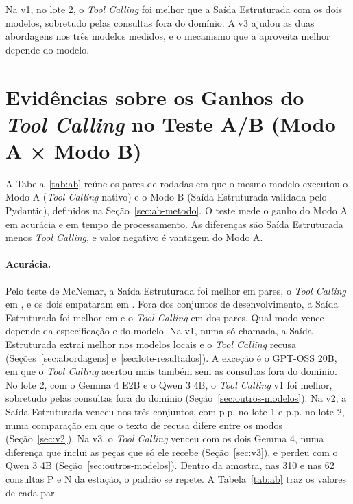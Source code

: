 Na v1, no lote 2, o \textit{Tool Calling} foi melhor que a Saída Estruturada com os dois modelos, sobretudo pelas consultas fora do domínio. A v3 ajudou as duas abordagens nos três modelos medidos, e o mecanismo que a aproveita melhor depende do modelo.

\section{Evidências sobre os Ganhos do \texorpdfstring{\textit{Tool Calling}}{Tool Calling} no Teste A/B (Modo A × Modo B)}
\label{sec:ab}

A Tabela~\ref{tab:ab} reúne os  pares de rodadas em que o mesmo modelo executou o Modo A (\textit{Tool Calling} nativo) e o Modo B (Saída Estruturada validada pelo Pydantic), definidos na Seção~\ref{sec:ab-metodo}. O teste mede o ganho do Modo A em acurácia e em tempo de processamento. As diferenças são Saída Estruturada menos \textit{Tool Calling}, e valor negativo é vantagem do Modo A.

\begin{landscape}
{\renewcommand{\ABNTEXfontereduzida}{\scriptsize}}
\end{landscape}

\paragraph{Acurácia.} Pelo teste de McNemar, a Saída Estruturada foi melhor em  pares, o \textit{Tool Calling} em , e os dois empataram em . Fora dos conjuntos de desenvolvimento, a Saída Estruturada foi melhor em  e o \textit{Tool Calling} em  dos  pares. Qual modo vence depende da especificação e do modelo. Na v1, numa só chamada, a Saída Estruturada extrai melhor nos modelos locais e o \textit{Tool Calling} recusa (Seções~\ref{sec:abordagens} e~\ref{sec:lote-resultados}). A exceção é o GPT-OSS 20B, em que o \textit{Tool Calling} acertou mais também sem as consultas fora do domínio. No lote 2, com o Gemma 4 E2B e o Qwen 3 4B, o \textit{Tool Calling} v1 foi melhor, sobretudo pelas consultas fora do domínio (Seção~\ref{sec:outros-modelos}). Na v2, a Saída Estruturada venceu nos três conjuntos, com  p.p. no lote 1 e  p.p. no lote 2, numa comparação em que o texto de recusa difere entre os modos (Seção~\ref{sec:v2}). Na v3, o \textit{Tool Calling} venceu com os dois Gemma 4, numa diferença que inclui as peças que só ele recebe (Seção~\ref{sec:v3}), e perdeu com o Qwen 3 4B (Seção~\ref{sec:outros-modelos}). Dentro da amostra, nas 310 e nas 62 consultas P e N da estação, o padrão se repete. A Tabela~\ref{tab:ab} traz os valores de cada par.

